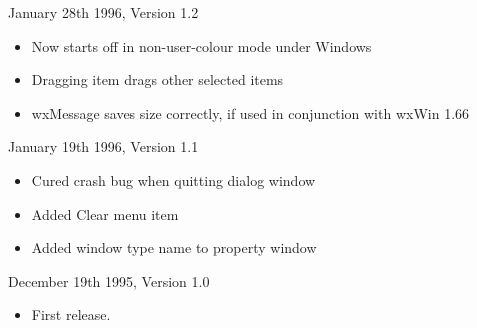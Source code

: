 January 28th 1996, Version 1.2

\begin{itemize}\itemsep=0pt
\item Now starts off in non-user-colour mode under Windows
\item Dragging item drags other selected items
\item wxMessage saves size correctly, if used in conjunction with wxWin 1.66
\end{itemize}

January 19th 1996, Version 1.1

\begin{itemize}\itemsep=0pt
\item Cured crash bug when quitting dialog window
\item Added Clear menu item
\item Added window type name to property window
\end{itemize}

December 19th 1995, Version 1.0

\begin{itemize}\itemsep=0pt
\item First release.
\end{itemize}

